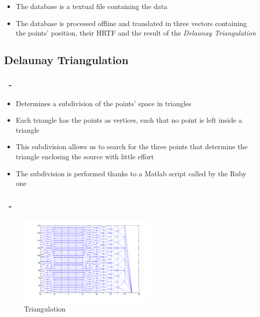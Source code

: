 \documentclass{beamer}
\begin{document}
	\begin{frame}
		\frametitle{\insertsection}
		\begin{itemize}
			\item The database is a textual file containing the data
			\item The database is processed offline and translated in three vectors containing the
				points' position, their HRTF and the result of the {\em Delaunay Triangulation}
		\end{itemize}
	\end{frame}

	\subsection{Delaunay Triangulation}

	\begin{frame}
		\frametitle{\insertsection\ - \insertsubsection}
		\begin{itemize}
			\item Determines a subdivision of the points' space in triangles
			\item Each triangle has the points as vertices, such that no point is left inside a triangle
			\item This subdivision allows us to search for the three points that determine the triangle enclosing the
				source with little effort
			\item The subdivision is performed thanks to a Matlab script called by the Ruby one
		\end{itemize}
	\end{frame}

	\begin{frame}
		\frametitle{\insertsection\ - \insertsubsection}
		\begin{figure}
			\centering
			  \includegraphics[width=0.6\textwidth]{images/triangulation.png}
			  \caption{Triangulation}
		\end{figure}
	\end{frame}
\end{document}
